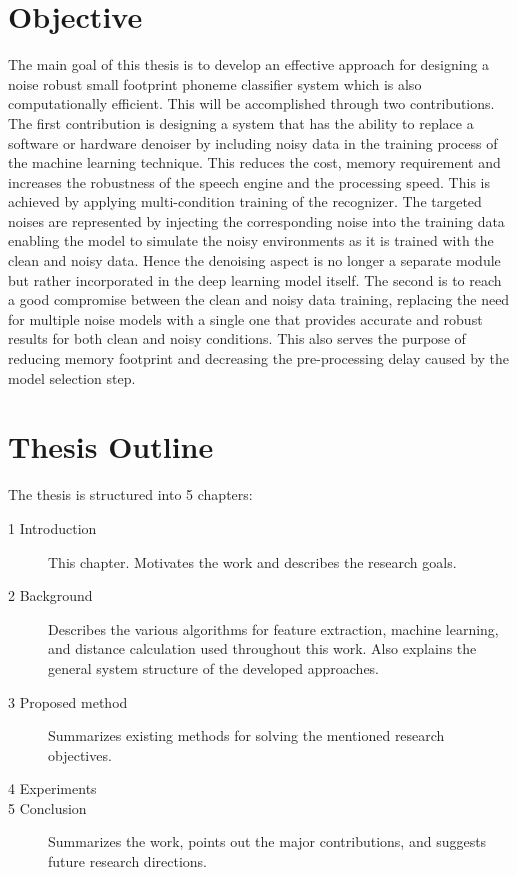     \section{Objective} \label{sec:intro_objective}
        The main goal of this thesis is to develop an effective approach for designing a noise robust small footprint phoneme classifier system which is also computationally efficient. 
        This will be accomplished through two contributions. 
        The first contribution is designing a system that has the ability to replace a software or hardware denoiser by including noisy data in the training process of the machine learning technique. 
        This reduces the cost, memory requirement and increases the robustness of the speech engine and the processing speed.
        This is achieved by applying multi-condition training of the recognizer. 
        The targeted noises are represented by injecting the corresponding noise into the training data enabling the model to simulate the noisy environments as it is trained with the clean and noisy data.
        Hence the denoising aspect is no longer a separate module but rather incorporated in the deep learning model itself.
        The second is to reach a good compromise between the clean and noisy data training, replacing the need for multiple noise models with a single one that provides accurate and robust results for both clean and noisy conditions. 
        This also serves the purpose of reducing memory footprint and decreasing the pre-processing delay caused by the model selection step.

    \section{Thesis Outline} \label{sec:intro_outline}
        The thesis is structured into 5 chapters:
        \begin{description}
            \item[1 Introduction] This chapter. Motivates the work and describes the research goals.
            \item[2 Background] Describes the various algorithms for feature extraction, machine learning, and distance calculation used throughout this work. Also explains the general system structure of the developed approaches.
            \item[3 Proposed method] Summarizes existing methods for solving the mentioned research objectives.
            \item[4 Experiments] 
            \item[5 Conclusion] Summarizes the work, points out the major contributions, and suggests future research directions.
        \end{description}

